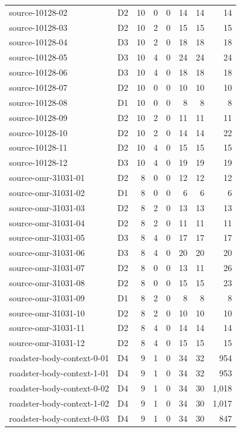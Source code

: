 \begin{longtable}{p{}lrrrrrr}
source-10128-02 & D2 & 10 & 0 & 0 & 14 & 14 & 14\\
source-10128-03 & D2 & 10 & 2 & 0 & 15 & 15 & 15\\
source-10128-04 & D3 & 10 & 2 & 0 & 18 & 18 & 18\\
source-10128-05 & D3 & 10 & 4 & 0 & 24 & 24 & 24\\
source-10128-06 & D3 & 10 & 4 & 0 & 18 & 18 & 18\\
source-10128-07 & D2 & 10 & 0 & 0 & 10 & 10 & 10\\
source-10128-08 & D1 & 10 & 0 & 0 & 8 & 8 & 8\\
source-10128-09 & D2 & 10 & 2 & 0 & 11 & 11 & 11\\
source-10128-10 & D2 & 10 & 2 & 0 & 14 & 14 & 22\\
source-10128-11 & D2 & 10 & 4 & 0 & 15 & 15 & 15\\
source-10128-12 & D3 & 10 & 4 & 0 & 19 & 19 & 19\\
source-omr-31031-01 & D2 & 8 & 0 & 0 & 12 & 12 & 12\\
source-omr-31031-02 & D1 & 8 & 0 & 0 & 6 & 6 & 6\\
source-omr-31031-03 & D2 & 8 & 2 & 0 & 13 & 13 & 13\\
source-omr-31031-04 & D2 & 8 & 2 & 0 & 11 & 11 & 11\\
source-omr-31031-05 & D3 & 8 & 4 & 0 & 17 & 17 & 17\\
source-omr-31031-06 & D3 & 8 & 4 & 0 & 20 & 20 & 20\\
source-omr-31031-07 & D2 & 8 & 0 & 0 & 13 & 11 & 26\\
source-omr-31031-08 & D2 & 8 & 0 & 0 & 15 & 15 & 23\\
source-omr-31031-09 & D1 & 8 & 2 & 0 & 8 & 8 & 8\\
source-omr-31031-10 & D2 & 8 & 2 & 0 & 10 & 10 & 10\\
source-omr-31031-11 & D2 & 8 & 4 & 0 & 14 & 14 & 14\\
source-omr-31031-12 & D2 & 8 & 4 & 0 & 15 & 15 & 15\\
roadster-body-context-0-01 & D4 & 9 & 1 & 0 & 34 & 32 & 954\\
roadster-body-context-1-01 & D4 & 9 & 1 & 0 & 34 & 32 & 953\\
roadster-body-context-0-02 & D4 & 9 & 1 & 0 & 34 & 30 & 1,018\\
roadster-body-context-1-02 & D4 & 9 & 1 & 0 & 34 & 30 & 1,017\\
roadster-body-context-0-03 & D4 & 9 & 1 & 0 & 34 & 30 & 847\\

\end{longtable}
